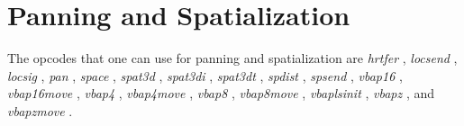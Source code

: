 \begin{comment}
\documentclass[10pt]{article}
\usepackage{fullpage, graphicx, url}
\setlength{\parskip}{1ex}
\setlength{\parindent}{0ex}
\title{Panning and Spatialization}



\begin{tabular}{ccc}
The Alternative Csound Reference Manual & & \\
Previous &Signal Modifiers &Next

\end{tabular}

\end{comment}
\section{Panning and Spatialization}


  The opcodes that one can use for panning and spatialization are \emph{hrtfer}
, \emph{locsend}
, \emph{locsig}
, \emph{pan}
, \emph{space}
, \emph{spat3d}
, \emph{spat3di}
, \emph{spat3dt}
, \emph{spdist}
, \emph{spsend}
, \emph{vbap16}
, \emph{vbap16move}
, \emph{vbap4}
, \emph{vbap4move}
, \emph{vbap8}
, \emph{vbap8move}
, \emph{vbaplsinit}
, \emph{vbapz}
, and \emph{vbapzmove}
. 


\begin{comment}
\begin{tabular}{lcr}
Previous &Home &Next \\
Envelope Modifiers &Up &Reverberation

\end{tabular}



\end{comment}
